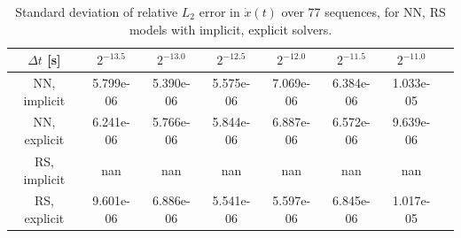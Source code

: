 \begin{table}[htbp]
    \centering
    \begin{tabular}{cccccccc}
        \hline
        $\Delta t$ [s] & $2^{-13.5}$ & $2^{-13.0}$ & $2^{-12.5}$ & $2^{-12.0}$ & $2^{-11.5}$ & $2^{-11.0}$ \\
        \hline
        NN, implicit & 5.799e-06 & 5.390e-06 & 5.575e-06 & 7.069e-06 & 6.384e-06 & 1.033e-05 \\
        NN, explicit & 6.241e-06 & 5.766e-06 & 5.844e-06 & 6.887e-06 & 6.572e-06 & 9.639e-06 \\
        RS, implicit & nan & nan & nan & nan & nan & nan \\
        RS, explicit & 9.601e-06 & 6.886e-06 & 5.541e-06 & 5.597e-06 & 6.845e-06 & 1.017e-05 \\
        \hline
    \end{tabular}
    \caption{Standard deviation of relative $L_2$ error in $\dot{x}(t)$ over 77 sequences, 
    for NN, RS models with implicit, explicit solvers.}
    \label{tab:StdL2ErrorSpringSliderRsVsNNRespective}
\end{table}